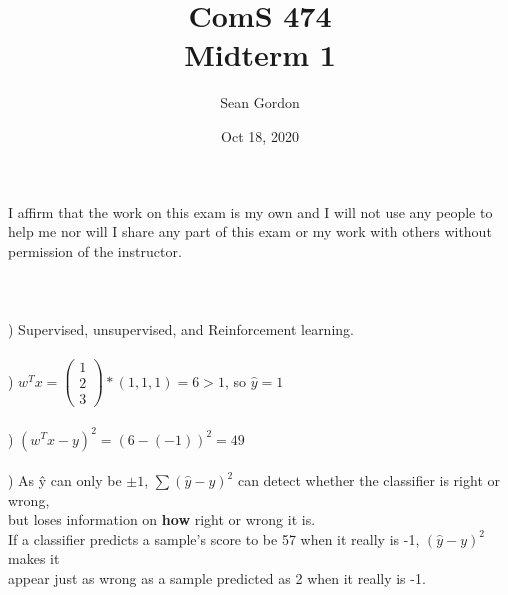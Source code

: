 \documentclass[12pt]{article}
\title{ComS 474\\Midterm 1}
\author{Sean Gordon}
\date{Oct 18, 2020}
\begin{document}
\maketitle



\noindent I affirm that the work on this exam is my own and I will not use any people to help me nor will I share any
part of this exam or my work with others without permission of the instructor.\\\\\\\\[-.4em]







) Supervised, unsupervised, and Reinforcement learning.\\



\noindent \hrulefill \\



) $w^Tx = 
\begin{pmatrix}
1\\ 2\\ 3
\end{pmatrix}
* (1, 1, 1) = 6 > 1$, so $\hat{y} = 1$\\[-.4em]



\noindent \hrulefill \\



) $(w^Tx-y)^2 = (6 - (-1))^2 = 49$\\[-.4em]



\noindent \hrulefill \\



) As \^{y} can only be $\pm1$, $\sum(\hat{y}-y)^2$ can detect whether the classifier is right or wrong, \\
but loses information on \textbf{how} right or wrong it is. \\
\indent If a classifier predicts a sample's score to be 57 when it really is -1, $(\hat{y}-y)^2$ makes it\\
appear just as wrong as a sample predicted as 2 when it really is -1.\\[-.4em]
\end{document}

